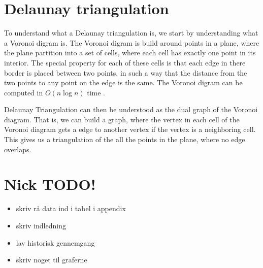 \chapter{Delaunay triangulation}\label{appendix:delaunaykruskal}

To understand what a Delaunay triangulation is, we start by understanding what a 
Voronoi digram is. The Voronoi digram is build around points in a plane, where 
the plane partition into a set of cells, where each cell has exactly one point 
in its interior. The special property for each of these cells is that each edge 
in there border is placed between two points, in such a way that the distance 
from the two points to any point on the edge is the same. The Voronoi digram can 
be computed in $O(n \log n)$ time \cite{CompGeo}. 

Delaunay Triangulation can then be understood as the dual graph of the Voronoi 
diagram. That is, we can build a graph, where the vertex in each cell of the 
Voronoi diagram gets a edge to another vertex if the vertex is a neighboring 
cell. This gives us a triangulation of the all the points in the plane, where
no edge overlaps.


\chapter{Nick TODO!}
\begin{itemize}
	\item skriv rå data ind i tabel i appendix
	\item skriv indledning
	\item lav historisk gennemgang
	\item skriv noget til graferne
\end{itemize}
